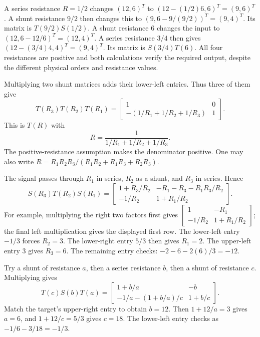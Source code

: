 A series resistance $R=1/2$ changes $(12,6)^T$ to
$(12-(1/2)6,6)^T=(9,6)^T$. A shunt resistance $9/2$ then
changes this to $(9,6-9/(9/2))^T=(9,4)^T$.
Its matrix is $T(9/2)S(1/2)$.
A shunt resistance $6$ changes the input to $(12,6-12/6)^T=(12,4)^T$.
A series resistance $3/4$ then gives $(12-(3/4)4,4)^T=(9,4)^T$.
Its matrix is $S(3/4)T(6)$. All four resistances are positive and
both calculations verify the required output, despite the different
physical orders and resistance values.

Multiplying two shunt matrices adds their lower-left entries.
Thus three of them give
\[T(R_3)T(R_2)T(R_1)
=\begin{bmatrix}1&0\\-(1/R_1+1/R_2+1/R_3)&1\end{bmatrix}.\]
This is $T(R)$ with
\[R=\frac1{1/R_1+1/R_2+1/R_3}.
\]
The positive-resistance assumption makes the denominator positive.
One may also write $R=R_1R_2R_3/(R_1R_2+R_1R_3+R_2R_3)$.

The signal passes through $R_1$ in series, $R_2$ as a shunt,
and $R_3$ in series. Hence
\[S(R_3)T(R_2)S(R_1)
=\begin{bmatrix}
1+R_3/R_2&-R_1-R_3-R_1R_3/R_2\\
-1/R_2&1+R_1/R_2
\end{bmatrix}.\]
For example, multiplying the right two factors first gives
$\begin{bmatrix}1&-R_1\\-1/R_2&1+R_1/R_2\end{bmatrix}$;
the final left multiplication gives the displayed first row.
The lower-left entry $-1/3$ forces $R_2=3$.
The lower-right entry $5/3$ then gives $R_1=2$.
The upper-left entry $3$ gives $R_3=6$.
The remaining entry checks: $-2-6-2(6)/3=-12$.

Try a shunt of resistance $a$, then a series resistance $b$, then
a shunt of resistance $c$. Multiplying gives
\[T(c)S(b)T(a)=\begin{bmatrix}
1+b/a&-b\\-1/a-(1+b/a)/c&1+b/c
\end{bmatrix}.\]
Match the target's upper-right entry to obtain $b=12$.
Then $1+12/a=3$ gives $a=6$, and $1+12/c=5/3$ gives $c=18$.
The lower-left entry checks as $-1/6-3/18=-1/3$.

